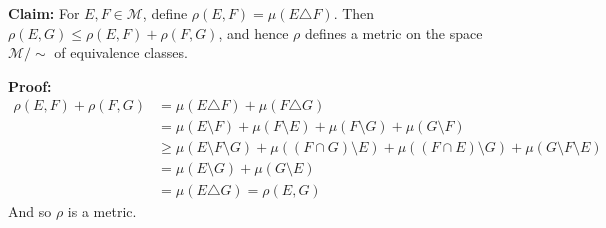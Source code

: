 \documentclass[11pt,letter]{article}
\begin{document}
\begin{enumerate}
    \textbf{Claim:} For $E,F \in \mathcal{M}$, define $\rho(E,F) = \mu(E \triangle F)$. Then $\rho(E,G) \le \rho(E,F) + \rho(F,G)$, and hence $\rho$ defines a metric on the space $\mathcal{M} / \sim$ of equivalence classes.

    \textbf{Proof:}
    \begin{align*}
        \rho(E,F) + \rho(F,G) & = \mu(E \triangle F) + \mu(F \triangle G) \\ & = \mu(E \setminus F) + \mu(F \setminus E) + \mu(F \setminus G) + \mu(G \setminus F) \\
        & \ge \mu(E \setminus F \setminus G) + \mu((F \cap G) \setminus E) + \mu((F \cap E) \setminus G) + \mu(G \setminus F \setminus E) \\
        & = \mu(E \setminus G) + \mu(G \setminus E) \\
        & = \mu(E \triangle G) = \rho(E,G)
    \end{align*}
    And so $\rho$ is a metric.
\end{enumerate}
\end{document}
